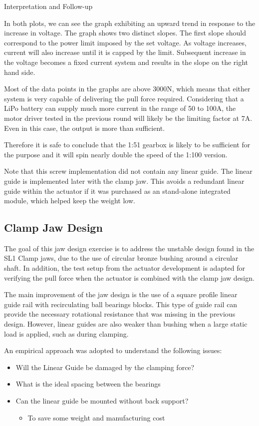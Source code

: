 Interpretation and Follow-up


In both plots, we can see the graph exhibiting an upward trend in response to the increase in voltage. The graph shows two distinct slopes. The first slope should correspond to the power limit imposed by the set voltage. As voltage increases, current will also increase until it is capped by the limit. Subsequent increase in the voltage becomes a fixed current system and results in the slope on the right hand side.

Most of the data points in the graphs are above 3000N, which means that either system is very capable of delivering the pull force required. Considering that a LiPo battery can supply much more current in the range of 50 to 100A, the motor driver tested in the previous round will likely be the limiting factor at 7A. Even in this case, the output is more than sufficient. 

Therefore it is safe to conclude that the 1:51 gearbox is likely to be sufficient for the purpose and it will spin nearly double the speed of the 1:100 version.

Note that this screw implementation did not contain any linear guide. The linear guide is implemented later with the clamp jaw. This avoids a redundant linear guide within the actuator if it was purchased as an stand-alone integrated module, which helped keep the weight low.  

\subsection{Clamp Jaw Design}

The goal of this jaw design exercise is to address the unstable design found in the SL1 Clamp jaws, due to the use of circular bronze bushing around a circular shaft. In addition, the test setup from the actuator development is adapted for verifying the pull force when the actuator is combined with the clamp jaw design.

The main improvement of the jaw design is the use of a square profile linear guide rail with recirculating ball bearings blocks. This type of guide rail can provide the necessary rotational resistance that was missing in the previous design. However, linear guides are also weaker than bushing when a large static load is applied, such as during clamping.

An empirical approach was adopted to understand the following issues:
\begin{itemize}
    \item Will the Linear Guide be damaged by the clamping force?
    \item What is the ideal spacing between the bearings
    \item Can the linear guide be mounted without back support?
    \begin{itemize}
      \item To save some weight and manufacturing cost
    \end{itemize}
\end{itemize}

